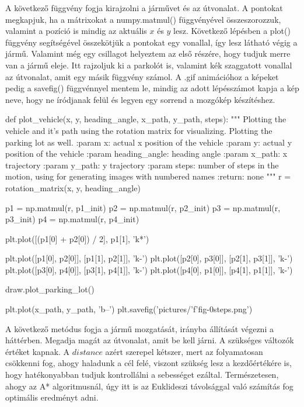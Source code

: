 \bigskip

A következő függvény fogja kirajzolni a járművet és az útvonalat. A pontokat megkapjuk, ha a mátrixokat a numpy.matmul() függvényével összeszorozzuk, valamint a pozíció is mindig az aktuális $ x $ és $ y $ lesz. Következő lépésben a plot() függvény segítségével összekötjük a pontokat egy vonallal, így lesz látható végig a jármű. Valamint még egy csillagot helyeztem az első részére, hogy tudjuk merre van a jármű eleje. Itt rajzoljuk ki a parkolót is, valamint kék szaggatott vonallal az útvonalat, amit egy másik függvény számol. A .gif animációhoz a képeket pedig a savefig() függvénnyel mentem le, mindig az adott lépésszámot kapja a kép neve, hogy ne íródjanak felül és legyen egy sorrend a mozgókép készítéshez.

\begin{python}
def plot_vehicle(x, y, heading_angle, x_path, y_path, steps):
    """
    Plotting the vehicle and it's path using the rotation matrix
    for visualizing.
    Plotting the parking lot as well.
    :param x: actual x position of the vehicle
    :param y: actual y position of the vehicle
    :param heading_angle: heading angle
    :param x_path: x trajectory
    :param y_path: y trajectory
    :param steps: number of steps in the motion, using for generating
    images with numbered names
    :return: none
    """
    r = rotation_matrix(x, y, heading_angle)

    p1 = np.matmul(r, p1_init)
    p2 = np.matmul(r, p2_init)
    p3 = np.matmul(r, p3_init)
    p4 = np.matmul(r, p4_init)

    plt.plot([(p1[0] + p2[0]) / 2], p1[1], 'k*')

    plt.plot([p1[0], p2[0]], [p1[1], p2[1]], 'k-')
    plt.plot([p2[0], p3[0]], [p2[1], p3[1]], 'k-')
    plt.plot([p3[0], p4[0]], [p3[1], p4[1]], 'k-')
    plt.plot([p4[0], p1[0]], [p4[1], p1[1]], 'k-')

    draw.plot_parking_lot()

    plt.plot(x_path, y_path, 'b--')
    plt.savefig('pictures/'f'fig-0{steps}.png')

\end{python}

\bigskip

A következő metódus fogja a jármű mozgatását, irányba állítását végezni a háttérben. Megadja magát az útvonalat, amit be kell járni. A szükséges változók értéket kapnak. A $ distance $ azért szerepel kétszer, mert az folyamatosan csökkenni fog, ahogy haladunk a cél felé, viszont szükség lesz a kezdőértékére is, hogy hatékonyabban tudjuk kontrollálni a sebességet ezáltal. Természetesen, ahogy az A* algoritmusnál, úgy itt is az Euklideszi távolsággal való számítás fog optimális eredményt adni.

